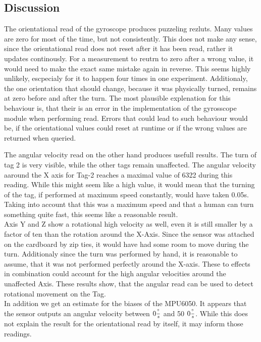 \subsection{Discussion}
\label{s:exp_3_conclusion}
The orientational read of the gyroscope produces puzzeling rezluts.
Many values are zero for most of the time, but not consistently.
This does not make any sense, since the orientational read does not reset after it has been read, rather it updates continously.
For a measurement to reutrn to zero after a wrong value, it would need to make the exact same mistake again in reverse.
This seems highly unlikely, escpecialy for it to happen four times in one experiment.
Additionaly, the one orientation that should change, because it was physically turned, remains at zero before and after the turn.
The most plausible explenation for this behaviour is, that their is an error in the implementation of the gyrosscope module when performing read.
Errors that could lead to such behaviour would be, if the orientational values could reset at runtime or if the wrong values are returned when queried.


The angular velocity read on the other hand produces usefull results.
The turn of tag 2 is very visible, while the other tags remain unaffected.
The angular velocity aaround the X axis for Tag-2 reaches a maximal value of 6322 during this reading.
While this might seem like a high value, it would mean that the turning of the tag, if performed at maximum speed constantly, would have taken 0.05s.
Taking into account that this was a maximum speed and that a human can turn something quite fast, this seems like a reasonable result.\\
Axis Y and Z show a rotational high velocity as well, even it is still smaller by a factor of ten than the rotation around the X-Axis.
Since the sensor was attached on the cardboard by zip ties, it would have had some room to move during the turn.
Additionaly since the turn was performed by hand, it is reasonable to assume, that it was not performed perfectly around the X-axis.
These to effects in combination could account for the high angular velocities around the unaffected Axis.
These results show, that the angular read can be used to detect rotational movement on the Tag. \\
In addition we get an estimate for the biases of the MPU6050.
It appears that the sensor outputs an angular velocity between $0\frac{^\circ}{s}$ and 50 $0\frac{^\circ}{s}$.
While this does not explain the result for the orientational read by itself, it may inform those readings.


